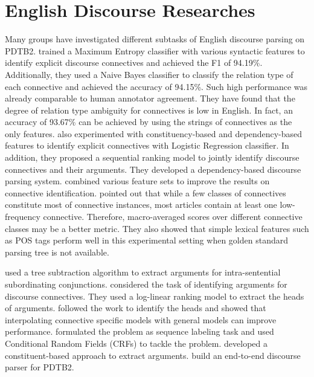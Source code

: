 \section{English Discourse Researches}

Many groups have investigated different subtasks of English
discourse parsing on PDTB2. \cite{pitler2009using} trained a Maximum
Entropy classifier with various syntactic features to identify explicit discourse
connectives and achieved the F1 of 94.19\%. Additionally, they used
a Naive Bayes classifier to classify the relation type of each connective and
achieved the accuracy of 94.15\%. Such high performance was already comparable to human
annotator agreement. They have found that the degree of relation type ambiguity
for connectives is low in English. In fact, an accuracy of 93.67\% can be achieved
by using the strings of connectives as the only features. \cite{wellner2009sequence}
also experimented with constituency-based and dependency-based features to identify
explicit connectives with Logistic Regression classifier. In addition, they proposed
a sequential ranking model to jointly identify discourse connectives and their arguments.
They developed a dependency-based discourse parsing system. \cite{faiz2013identifying} combined
various feature sets to improve the results on connective identification. \cite{j2013disambig} pointed
out that while a few classes of connectives constitute most of connective instances, most articles contain
at least one low-frequency connective. Therefore, macro-averaged scores over different connective
classes may be a better metric. They also showed that simple lexical features such as POS tags perform
well in this experimental setting when golden standard parsing tree is not available.

\cite{dines2005attribution} used a tree subtraction algorithm to extract arguments for
intra-sentential subordinating conjunctions. \cite{wellner2007auto} considered the task of identifying
arguments for discourse connectives. They used a log-linear ranking model to extract the heads of arguments.
\cite{elwell2008discourse} followed the work to identify the heads and showed that
interpolating connective specific models with general models can improve performance.
\cite{ghosh2011shallow,ghosh2012global} formulated the problem as sequence labeling task
and used Conditional Random Fields (CRFs) to tackle the problem.
\cite{kong2014a} developed a constituent-based approach to extract arguments.
\cite{lin2014pdtb} build an end-to-end discourse parser for PDTB2.


